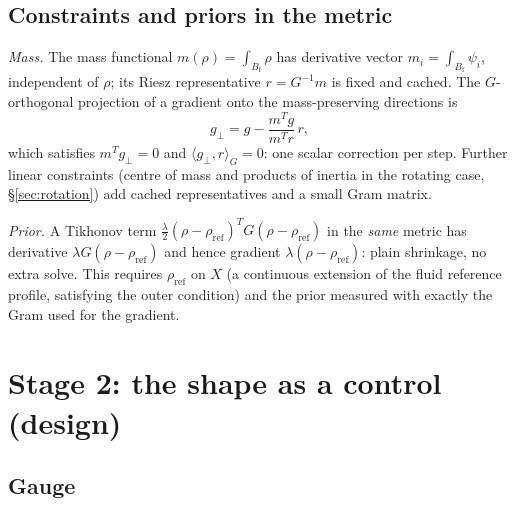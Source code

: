 \documentclass[11pt]{article}
\newcommand{\Bf}{B_{\mathrm{f}}}
\newcommand{\ip}[2]{\langle #1, #2\rangle}
\begin{document}
\subsection{Constraints and priors in the metric}

\emph{Mass.} The mass functional $m(\rho) = \int_{\Bf}\rho$ has
derivative vector $m_i = \int_{\Bf}\psi_i$, independent of $\rho$; its
Riesz representative $r = G^{-1}m$ is fixed and cached. The
$G$-orthogonal projection of a gradient onto the mass-preserving
directions is
\begin{equation}
  g_\perp = g - \frac{m^{T}g}{m^{T}r}\,r ,
\end{equation}
which satisfies $m^{T}g_\perp = 0$ and $\ip{g_\perp}{r}_G = 0$: one scalar
correction per step. Further linear constraints (centre of mass and
products of inertia in the rotating case, \S\ref{sec:rotation}) add
cached representatives and a small Gram matrix.

\emph{Prior.} A Tikhonov term $\frac{\lambda}{2}(\rho-\rho_{\mathrm{ref}})^T
G(\rho-\rho_{\mathrm{ref}})$ in the \emph{same} metric has derivative
$\lambda G(\rho-\rho_{\mathrm{ref}})$ and hence gradient
$\lambda(\rho-\rho_{\mathrm{ref}})$: plain shrinkage, no extra solve.
This requires $\rho_{\mathrm{ref}}$ on $X$ (a continuous extension of the
fluid reference profile, satisfying the outer condition) and the prior
measured with exactly the Gram used for the gradient.

\section{Stage 2: the shape as a control (design)}
\label{sec:stage2}

\subsection{Gauge}
\end{document}
